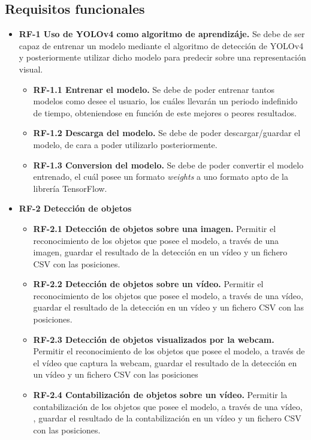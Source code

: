 \subsection{Requisitos funcionales}
\begin{itemize}
    \tightlist
    \item \textbf{RF-1 Uso de YOLOv4 como algoritmo de aprendizáje.} Se debe de ser capaz de entrenar un modelo mediante el algoritmo de detección de YOLOv4 y posteriormente utilizar dicho modelo para predecir sobre una representación visual.
    \begin{itemize}
    \tightlist
    \item \textbf{RF-1.1 Entrenar el modelo.} Se debe de poder entrenar tantos modelos como desee el usuario, los cuáles llevarán un periodo indefinido de tiempo, obteniendose en función de este mejores o peores resultados.
    \item \textbf{RF-1.2 Descarga del modelo.} Se debe de poder descargar/guardar el modelo, de cara a poder utilizarlo posteriormente.
    \item \textbf{RF-1.3 Conversion del modelo.} Se debe de poder convertir el modelo entrenado, el cuál posee un formato \textit{weights} a uno formato apto de la librería TensorFlow.
    \end{itemize}
    \item \textbf{RF-2 Detección de objetos}
    \begin{itemize}
      \tightlist
      \item \textbf{RF-2.1 Detección de objetos sobre una imagen.} Permitir el reconocimiento de los objetos que posee el modelo, a través de una imagen, guardar el resultado de la detección en un vídeo y un fichero CSV con las posiciones.
      \item \textbf{RF-2.2 Detección de objetos sobre un vídeo.} Permitir el reconocimiento de los objetos que posee el modelo, a través de una vídeo, guardar el resultado de la detección en un vídeo y un fichero CSV con las posiciones.
      \item \textbf{RF-2.3 Detección de objetos visualizados por la webcam.} Permitir el reconocimiento de los objetos que posee el modelo, a través de el vídeo que captura la webcam, guardar el resultado de la detección en un vídeo y un fichero CSV con las posiciones
      \item \textbf{RF-2.4 Contabilización de objetos sobre un vídeo.} Permitir la contabilización de los objetos que posee el modelo, a través de una vídeo, , guardar el resultado de la contabilización en un vídeo y un fichero CSV con las posiciones.
    \end{itemize}
\end{itemize}

